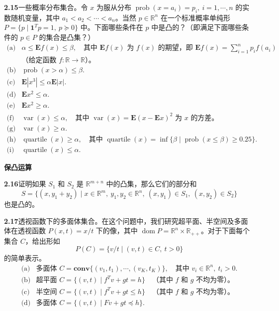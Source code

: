 \documentclass[UTF8,12pt,a4paper,fontset=fandol]{ctexart}
\begin{document}
\noindent\textbf{2.15}\quad 一些概率分布集合。令 $x$ 为服从分布 $\operatorname{prob}(x=a_i)=p_i,\ i=1,\cdots,n$ 的实数随机变量，其中 $a_1<a_2<\cdots<a_n$。当然 $p\in\mathbb{R}^n$ 在一个标准概率单纯形 $P=\{p\mid \mathbf{1}^Tp=1,\ p\succeq0\}$ 中。下面哪些条件在 $p$ 中是凸的？（即满足下面哪些条件的 $p\in P$ 的集合是凸集？）
\[
  \begin{array}{ll}
  \text{(a)} & \alpha\le \mathbf{E}f(x)\le\beta,\quad
    \text{其中 }\mathbf{E}f(x)\text{ 为 }f(x)\text{ 的期望，即 }\mathbf{E}f(x)=\sum_{i=1}^n p_if(a_i)\\
  & \text{（给定函数 }f:\mathbb{R}\to\mathbb{R}\text{）。}\\[0.3em]
  \text{(b)} & \operatorname{prob}(x>\alpha)\le\beta.\\
  \text{(c)} & \mathbf{E}|x^3|\le\alpha\mathbf{E}|x|.\\
  \text{(d)} & \mathbf{E}x^2\le\alpha.\\
  \text{(e)} & \mathbf{E}x^2\ge\alpha.\\
  \text{(f)} & \operatorname{var}(x)\le\alpha,\quad \text{其中 }\operatorname{var}(x)=\mathbf{E}(x-\mathbf{E}x)^2\text{ 为 }x\text{ 的方差。}\\
  \text{(g)} & \operatorname{var}(x)\ge\alpha.\\
  \text{(h)} & \operatorname{quartile}(x)\ge\alpha,\quad \text{其中 }\operatorname{quartile}(x)=\inf\{\beta\mid \operatorname{prob}(x\le\beta)\ge0.25\}.\\
  \text{(i)} & \operatorname{quartile}(x)\le\alpha.
  \end{array}
\]

\noindent\textbf{保凸运算}

\noindent\textbf{2.16}\quad 证明如果 $S_1$ 和 $S_2$ 是 $\mathbb{R}^{m+n}$ 中的凸集，那么它们的部分和
\[
  S=\{(x,y_1+y_2)\mid x\in\mathbb{R}^m,\ y_1,y_2\in\mathbb{R}^n,\ (x,y_1)\in S_1,\ (x,y_2)\in S_2\}
\]
也是凸的。

\noindent\textbf{2.17}\quad 透视函数下的多面体集合。在这个问题中，我们研究超平面、半空间及多面体在透视函数 $P(x,t)=x/t$ 下的像，其中 $\operatorname{dom}P=\mathbb{R}^n\times\mathbb{R}_{++}$。对于下面每个集合 $C$，给出形如
\[
  P(C)=\{v/t\mid (v,t)\in C,\ t>0\}
\]
的简单表示。
\[
  \begin{array}{ll}
  \text{(a)} & \text{多面体 }C=\mathbf{conv}\{(v_1,t_1),\cdots,(v_K,t_K)\},\quad \text{其中 }v_i\in\mathbb{R}^n,\ t_i>0.\\[0.3em]
  \text{(b)} & \text{超平面 }C=\{(v,t)\mid f^Tv+gt=h\}\quad \text{（其中 }f\text{ 和 }g\text{ 不均为零）。}\\[0.3em]
  \text{(c)} & \text{半空间 }C=\{(v,t)\mid f^Tv+gt\le h\}\quad \text{（其中 }f\text{ 和 }g\text{ 不均为零）。}\\[0.3em]
  \text{(d)} & \text{多面体 }C=\{(v,t)\mid Fv+gt\preceq h\}.
  \end{array}
\]
\end{document}
